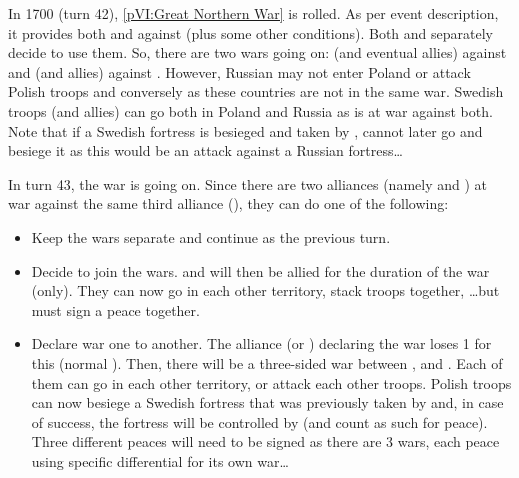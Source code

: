 \begin{exemple}
  In 1700 (turn 42), \ref{pVI:Great Northern War} is rolled. As per event
  description, it provides both \RUS and \POL \CB against \SUE (plus some
  other conditions). Both \RUS and \POL separately decide to use them. So,
  there are two wars going on: \RUS (and eventual allies) against \SUE and
  \POL (and allies) against \SUE. However, Russian may not enter Poland or
  attack Polish troops and conversely as these countries are not in the same
  war. Swedish troops (and allies) can go both in Poland and Russia as \SUE is
  at war against both. Note that if a Swedish fortress is besieged and taken
  by \RUS, \POL cannot later go and besiege it as this would be an attack
  against a Russian fortress\ldots

  In turn 43, the war is going on. Since there are two alliances (namely \RUS
  and \POL) at war against the same third alliance (\SUE), they can do one of
  the following:
  \begin{itemize}
  \item Keep the wars separate and continue as the previous turn.
  \item Decide to join the wars. \RUS and \POL will then be allied for the
    duration of the war (only). They can now go in each other territory, stack
    troops together, \ldots but must sign a peace together.
  \item Declare war one to another. The alliance (\RUS or \POL) declaring the
    war loses 1 \STAB for this (normal \CB). Then, there will be a three-sided
    war between \SUE, \RUS and \POL. Each of them can go in each other
    territory, or attack each other troops. Polish troops can now besiege a
    Swedish fortress that was previously taken by \RUS and, in case of
    success, the fortress will be controlled by \POL (and count as such for
    peace). Three different peaces will need to be signed as there are 3 wars,
    each peace using specific differential for its own war\ldots
  \end{itemize}
\end{exemple}


